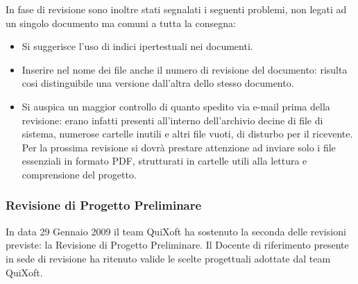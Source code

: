 \documentclass[11pt,a4paper]{article}
\begin{document}
In fase di revisione sono inoltre stati segnalati i seguenti problemi, non legati ad un singolo documento ma comuni a tutta la consegna:
\begin{itemize}
\item Si suggerisce l'uso di indici ipertestuali nei documenti.
\item Inserire nel nome dei file anche il numero di revisione del documento: risulta cosi distinguibile una versione dall'altra dello stesso documento.
\item Si auspica un maggior controllo di quanto spedito via e-mail prima della revisione: erano infatti presenti all'interno dell'archivio decine di file di sistema, numerose cartelle inutili e altri file vuoti, di disturbo per il ricevente. Per la prossima revisione si dovrà prestare attenzione ad inviare solo i file essenziali in formato PDF, strutturati in cartelle utili alla lettura e comprensione del progetto.
\end{itemize}

\subsubsection{Revisione di Progetto Preliminare}
In data 29 Gennaio 2009 il team QuiXoft ha sostenuto la seconda delle revisioni previste: la Revisione di Progetto Preliminare.
Il Docente di riferimento presente in sede di revisione ha ritenuto valide le scelte progettuali adottate dal team QuiXoft.
\end{document}
